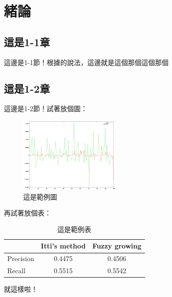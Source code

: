 \chapter{緒論}
\label{c:intro}
\section{這是1-1章}
這邊是1-1節！根據\cite{Rowe:2005:ASR}的說法，這邊就是這個那個這個那個

\newpage
\section{這是1-2章}
這邊是1-2節！試著放個圖：
\begin{figure}[h!]
\centering
\includegraphics[width=0.45\textwidth]{sample}
\caption{這是範例圖}
\label{kl}
\end{figure}

再試著放個表：
\begin{table}[h!]
\begin{center}
\begin{tabular}{lcc}

\hline
                    &  {\small Itti's method}     & {\small Fuzzy growing}    \\
\hline
{\small Precision}           &  0.4475    & 0.4506 \\
{\small Recall}              &  0.5515    & 0.5542 \\
\hline

\end{tabular}
\caption{這是範例表}
\label{t:FOA}
\end{center}
\end{table}

就這樣啦！
